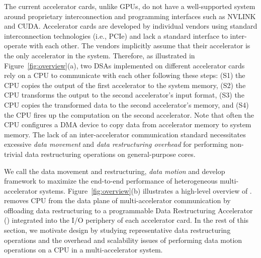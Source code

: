 %
The current accelerator cards, unlike GPUs, do not have a well-supported system around proprietary interconnection and programming interfaces such as NVLINK and CUDA. %
%
%
Accelerator cards are developed by individual vendors using standard interconnection technologies (i.e., PCIe) and lack a standard interface to inter-operate with each other. The vendors implicitly assume that their accelerator is the only accelerator in the system.
% 
Therefore, as illustrated in Figure~\ref{fig:overview}(a), two DSAs implemented on different accelerator cards rely on a CPU to communicate with each other following these steps: (S1) the CPU copies the output of the first accelerator to the system memory, (S2) the CPU transforms the output to the second accelerator's input format, (S3) the CPU copies the transformed data to the second accelerator's memory, and (S4) the CPU fires up the computation on the second accelerator. Note that often the CPU configures a DMA device to copy data from accelerator memory to system memory. 
%
%
%
%
%
%
The lack of an inter-accelerator communication standard necessitates excessive \textit{data movement} and \textit{data restructuring overhead} for performing non-trivial data restructuring operations on general-purpose cores. 

%
We call the data movement and restructuring, \textit{data motion} and develop \dmx framework to maximize the end-to-end performance of heterogeneous multi-accelerator systems. Figure~\ref{fig:overview}(b) illustrates a high-level overview of \dmx. \dmx removes CPU from the data plane of multi-accelerator communication by offloading data restructuring to a programmable Data Restructuring Accelerator (\drx) integrated into the I/O periphery of each accelerator card. 
%
In the rest of this section, we motivate \dmx design by studying representative data restructuring operations and the overhead and scalability issues of performing data motion operations on a CPU in a multi-accelerator system.

